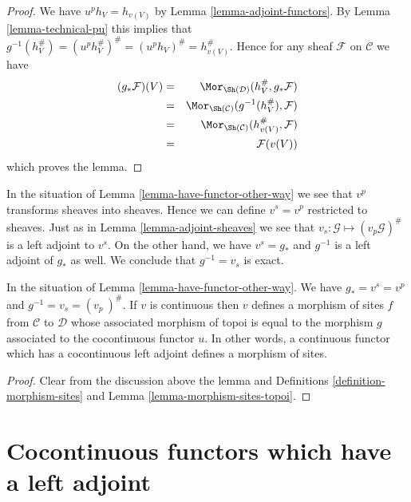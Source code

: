 \begin{proof}
We have $u^ph_V = h_{v(V)}$ by Lemma \ref{lemma-adjoint-functors}.
By Lemma \ref{lemma-technical-pu} this implies that
$g^{-1}(h_V^\#) = (u^ph_V^\#)^\# = (u^ph_V)^\# = h_{v(V)}^\#$.
Hence for any sheaf $\mathcal{F}$ on $\mathcal{C}$ we have
\begin{eqnarray*}
(g_*\mathcal{F})(V)
& = &
\Mor_{\Sh(\mathcal{D})}(h_V^\#, g_*\mathcal{F}) \\
& = &
\Mor_{\Sh(\mathcal{C})}(g^{-1}(h_V^\#), \mathcal{F}) \\
& = &
\Mor_{\Sh(\mathcal{C})}(h_{v(V)}^\#, \mathcal{F}) \\
& = &
\mathcal{F}(v(V))
\end{eqnarray*}
which proves the lemma.
\end{proof}

\noindent
In the situation of Lemma \ref{lemma-have-functor-other-way}
we see that $v^p$ transforms sheaves
into sheaves. Hence we can define $v^s = v^p$ restricted to sheaves.
Just as in Lemma \ref{lemma-adjoint-sheaves} we see that
$v_s : \mathcal{G} \mapsto (v_p\mathcal{G})^\#$ is a left adjoint to $v^s$.
On the other hand, we have $v^s = g_*$ and $g^{-1}$ is a left
adjoint of $g_*$ as well. We conclude that $g^{-1} = v_s$ is exact.

\begin{lemma}
\label{lemma-have-functor-other-way-morphism}
In the situation of Lemma \ref{lemma-have-functor-other-way}.
We have $g_* = v^s = v^p$ and $g^{-1} = v_s = (v_p\ )^\#$.
If $v$ is continuous then $v$ defines a morphism of sites $f$
from $\mathcal{C}$ to $\mathcal{D}$ whose associated morphism
of topoi is equal to the morphism $g$ associated to the cocontinuous
functor $u$. In other words, a continuous functor which has a
cocontinuous left adjoint defines a morphism of sites.
\end{lemma}

\begin{proof}
Clear from the discussion above the lemma and
Definitions \ref{definition-morphism-sites} and
Lemma \ref{lemma-morphism-sites-topoi}.
\end{proof}







\section{Cocontinuous functors which have a left adjoint}
\label{section-cocontinuous-left-adjoint}

